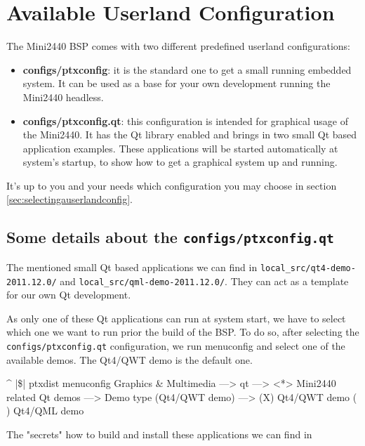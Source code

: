 \section{Available Userland Configuration}	\label{sec:userland}

The Mini2440 BSP comes with two different predefined userland configurations:

\begin{itemize}
	\item \textbf{configs/ptxconfig}: it is the standard one to get a small
	running embedded system. It can be used as a base for your own
	development running the Mini2440 headless.
	\item \textbf{configs/ptxconfig.qt}: this configuration is intended for
	graphical usage of the Mini2440. It has the Qt library enabled and brings
	in two small Qt based application examples. These applications will be
	started automatically at system's startup, to show how to get a
	graphical system up and running.
\end{itemize}

It's up to you and your needs which configuration you may choose in section
\ref{sec:selectingauserlandconfig}.

\subsection{Some details about the \texttt{configs/ptxconfig.qt}}

The mentioned small Qt based applications we can find in
\texttt{local\_src/qt4-demo-2011.12.0/} and \texttt{local\_src/qml-demo-2011.12.0/}.
They can act as a template for our own Qt development.

As only one of these Qt applications can run at system start, we have to select
which one we want to run prior the build of the BSP. To do so, after selecting
the \texttt{configs/ptxconfig.qt} configuration, we run menuconfig and select
one of the available demos. The Qt4/QWT demo is the default one.

\begin{ptxshell}[escapechar=|]{^}
|\$| ptxdist menuconfig
  Graphics & Multimedia  --->
     qt --->
        <*> Mini2440 related Qt demos --->
           Demo type (Qt4/QWT demo) --->
              (X) Qt4/QWT demo
              ( ) Qt4/QML demo
\end{ptxshell}

The "secrets" how to build and install these applications we can find in

